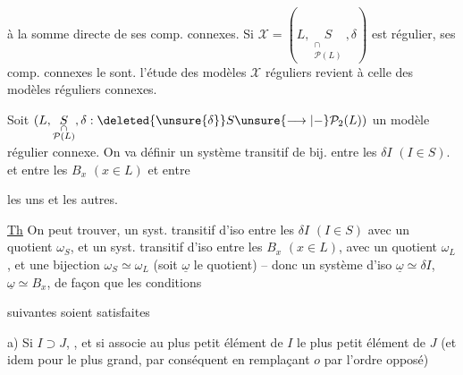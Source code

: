 à la somme directe de ses comp. connexes. Si $\mathcal X=(L,\underset{\substack{\cap\\\mathcal P(L)}}{S},\delta)$ est régulier,  ses comp. connexes le sont.  l'étude des modèles $\mathcal X$ réguliers  revient à celle des modèles réguliers connexes.

Soit $(L,\underset{\substack{\cap\\\mathcal P(L)}}{S},\delta:\deleted{\unsure{\delta}}S\unsure{\longrightarrow|-}\mathcal P_2(L))$ un modèle régulier connexe. On va définir un système transitif de bij. entre les $\delta I$ $(I\in S)$. et entre les $B_x$ $(x\in L)$ et entre


les uns et les autres. 


\uline{Th} On peut trouver,  un syst. transitif d'iso entre les $\delta I$ $(I\in S)$ avec un quotient $\omega_S$, et un syst. transitif d'iso entre les $B_x$ $(x\in L)$, avec un quotient $\omega_L$, et une bijection $\omega_S\simeq\omega_L$ (soit $\underline{\omega}$ le quotient) -- donc un système d'iso $\underline{\omega}\simeq\delta I$, $\underline{\omega}\simeq B_x$, de façon que les conditions




suivantes soient satisfaites

a) Si $I\supset J$, , et si     associe au plus petit élément de $I$ le plus petit élément de $J$ (et idem pour le plus grand, par conséquent en  remplaçant $o$ par l'ordre opposé)

